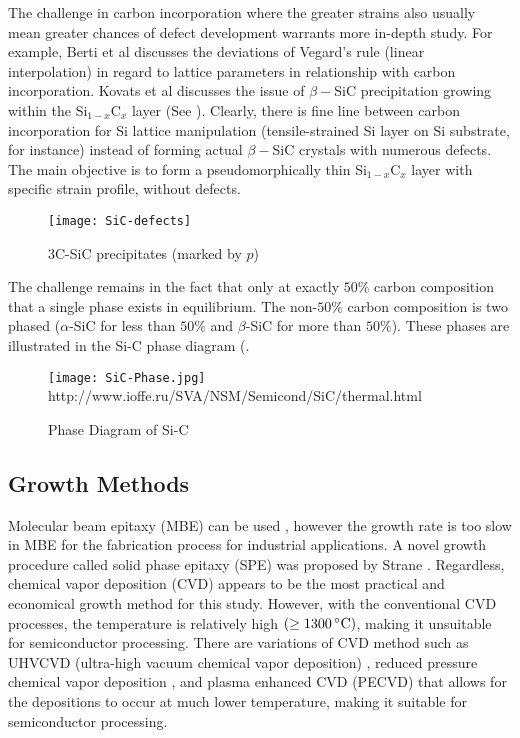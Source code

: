 The challenge in carbon incorporation where the greater strains also usually mean greater chances of defect development warrants more in-depth study.  For example, Berti et al \cite{Berti1} discusses the deviations of Vegard's rule (linear interpolation) in regard to lattice parameters in relationship with carbon incorporation.  Kovats et al  \cite{Kovats1} discusses the issue of $\beta-$SiC precipitation growing within the Si$_{1-x}$C$_x$ layer (See ).  Clearly, there is fine line between carbon incorporation for Si lattice manipulation (tensile-strained Si layer on Si substrate, for instance) instead of forming actual $\beta-$SiC crystals with numerous defects.  The main objective is to form a pseudomorphically thin Si$_{1-x}$C$_x$ layer with specific strain profile, without defects.  

\begin{figure}[h]
\centering
\caption{3C-SiC precipitates (marked by $p$) \cite{Lindner1}}
\label{SiC-defect}
\texttt{[image: SiC-defects]}
\end{figure}

The challenge remains in the fact that only at exactly $50\%$ carbon composition that a single phase exists in equilibrium.  The non-$50\%$ carbon composition is two phased ($\alpha$-SiC for less than $50\%$ and $\beta$-SiC for more than $50\%$).  These phases are illustrated in the Si-C phase diagram (.
\begin{figure}[h]
\caption{Phase Diagram of Si-C}
\label{SiC-Phase}
\centering
\texttt{[image: SiC-Phase.jpg]}
{http://www.ioffe.ru/SVA/NSM/Semicond/SiC/thermal.html}
\end{figure}

\subsection{Growth Methods}

Molecular beam epitaxy (MBE) can be used \cite{Eberl1,Fissel1}, however the growth rate is too slow in MBE for the fabrication process for industrial applications.  A novel growth procedure called solid phase epitaxy (SPE) was proposed by Strane \cite{Kramer1,Strane1}.  Regardless, chemical vapor deposition (CVD) appears to be the most practical and economical growth method for this study. However, with the conventional CVD processes, the temperature is relatively high $(\geq 1300\,^{\circ}\mathrm{C})$, making it unsuitable for semiconductor processing.   There are variations of CVD method such as  UHVCVD (ultra-high vacuum chemical vapor deposition) \cite{Calmes1}, reduced pressure chemical vapor deposition \cite{Hartmann1,Hartmann2}, and plasma enhanced CVD (PECVD) \cite{Ambrosone1,Coscia1,Coscia2,Coscia3,Basa1,Tong1,Ambrosone2,Ambrosone3,Ambrosone4,Basa3} that allows for the depositions to occur at much lower temperature, making it suitable for semiconductor processing.

